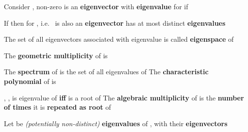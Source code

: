 \begin{itemize}

      \vItem
            Consider , non-zero
             is an \textbf{eigenvector} with
            \textbf{eigenvalue}  for  if

            \begin{itemize}

                  \vItem
                        If  then
                         for
                        , i.e.~ is also an
                        \textbf{eigenvector}
                  \vItem
                         has at most  distinct \textbf{eigenvalues}
            \end{itemize}
      \vItem
            The set of all eigenvectors associated with eigenvalue \iMbox{\lambda}
            is called \textbf{eigenspace}  of 

            \begin{itemize}

                  \vItem
                  \vItem
                        The \textbf{geometric multiplicity} of \iMbox{\lambda} is
            \end{itemize}
      \vItem
            The \textbf{spectrum}
             of  is
            the set of all eigenvalues of 
      \vItem
            The \textbf{characteristic polynomial} of  is

            \begin{itemize}

                  \vItem
                        , ,
                  \vItem
                         is eigenvalue of 
                        \textbf{iff} \iMbox{\lambda} is a root of 
                  \vItem
                        The \textbf{algebraic multiplicity} of \iMbox{\lambda} is the
                        \textbf{number of times} it is \textbf{repeated as root} of
                  \vItem
                          
            \end{itemize}
      \vItem
            Let  be
            \emph{(potentially non-distinct)} \textbf{eigenvalues} of ,
            with 
            their \textbf{eigenvectors}


\end{itemize}
